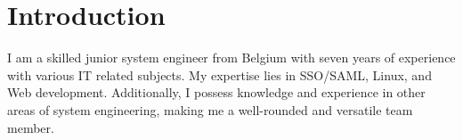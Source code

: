 \section{Introduct\textcolor{mycolor}{ion}}
\begin{center}
  I am a skilled junior \textcolor{mycolor}{system engineer} from Belgium with seven years of experience with various \textcolor{mycolor}{IT} related subjects.
  My expertise lies in \textcolor{mycolor}{SSO/SAML, Linux, and Web development}. Additionally, 
  I possess knowledge and experience in other areas of system engineering, making me a well-rounded and versatile team member.
\end{center}

